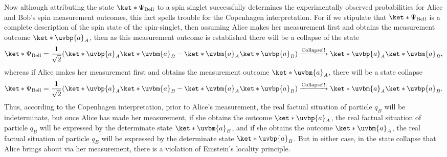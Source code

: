 \documentclass[12pt]{report}
\begin{document}
Now although attributing the state $\ket*{\Psi_{\text{Bell}}}$ to a spin singlet successfully determines the experimentally observed probabilities for  Alice and Bob's spin measurement outcomes, this fact spells trouble for the Copenhagen interpretation. For if we stipulate that $\ket*{\Psi_{\text{Bell}}}$ is a complete description of the spin state of the spin-singlet, then assuming Alice makes her measurement first and obtains the measurement outcome $\ket*{\uvbp{a}}_A$, then as this measurement outcome is established there will be a collapse of the state
\begin{equation}\label{BellCollapse1}
\ket*{\Psi_{\text{Bell}}}=\frac{1}{\sqrt{2}}(\ket*{\uvbp{a}}_A\ket*{\uvbm{a}}_B-\ket*{\uvbm{a}}_A\ket*{\uvbp{a}}_B)\xrightarrow{\text{Collapse!!}}\ket*{\uvbp{a}}_A\ket*{\uvbm{a}}_B,
\end{equation}
whereas if Alice makes her measurement first and obtains the measurement outcome $\ket*{\uvbm{a}}_A$, there will be a state collapse
\begin{equation}\label{BellCollapse2}
    \ket*{\Psi_{\text{Bell}}}=\frac{1}{\sqrt{2}}(\ket*{\uvbp{a}}_A\ket*{\uvbm{a}}_B-\ket*{\uvbm{a}}_A\ket*{\uvbp{a}}_B)\xrightarrow{\text{Collapse!!}}\ket*{\uvbm{a}}_A\ket*{\uvbp{a}}_B.
    \end{equation}
Thus, according to the Copenhagen interpretation, prior to Alice's measurement, the real factual situation of particle $q_B$ will be indeterminate, but once Alice has made her measurement, if she obtains the outcome $\ket*{\uvbp{a}}_A$, the real factual situation of particle $q_B$ will be expressed by the determinate state $\ket*{\uvbm{a}}_B$, and if she obtains the outcome $\ket*{\uvbm{a}}_A$, the real factual situation of particle $q_B$ will be expressed by the determinate state $\ket*{\uvbp{a}}_B$. But in either case, in the state collapse that Alice brings about via her measurement, there is a violation of Einstein's locality principle. 
\end{document}
